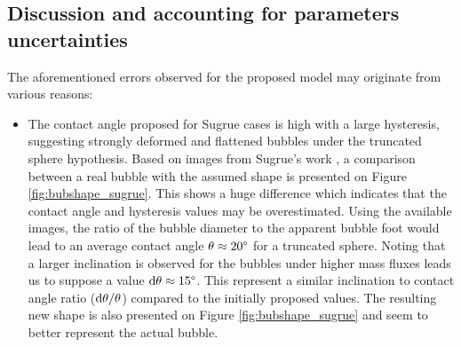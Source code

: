 \subsection{Discussion and accounting for parameters uncertainties}


The aforementioned errors observed for the proposed model may originate from various reasons:

\begin{itemize}
\item The contact angle proposed for Sugrue cases is high with a large hysteresis, suggesting strongly deformed and flattened bubbles under the truncated sphere hypothesis. Based on images from Sugrue's work \cite{sugrue_experimental_2014}, a comparison between a real bubble with the assumed shape is presented on Figure \ref{fig:bubshape_sugrue}. This shows a huge difference which indicates that the contact angle and hysteresis values may be overestimated. Using the available images, the ratio of the bubble diameter to the apparent bubble foot would lead to an average contact angle $\theta \approx 20\degree$ for a truncated sphere. Noting that a larger inclination is observed for the bubbles under higher mass fluxes leads us to suppose a value $\mathrm{d}\theta \approx 15\degree$. This represent a similar inclination to contact angle ratio ($\mathrm{d}\theta / \theta$) compared to the initially proposed values. The resulting new shape is also presented on Figure \ref{fig:bubshape_sugrue} and seem to better represent the actual bubble.





\end{itemize}
